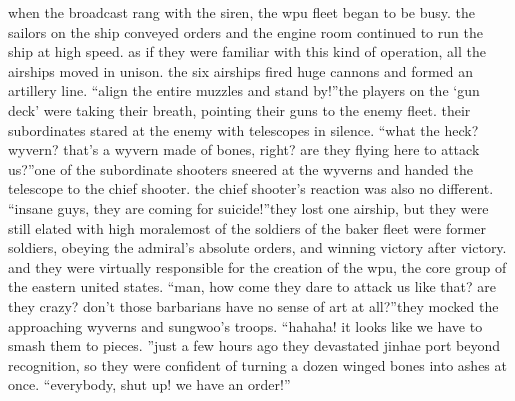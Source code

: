 when the broadcast rang with the siren, the wpu fleet began to be busy.
 the sailors on the ship conveyed orders and the engine room continued to run the ship at high speed.
as if they were familiar with this kind of operation, all the airships moved in unison.
the six airships fired huge cannons and formed an artillery line.
“align the entire muzzles and stand by!”the players on the ‘gun deck’ were taking their breath, pointing their guns to the enemy fleet.
their subordinates stared at the enemy with telescopes in silence.
“what the heck? wyvern? that’s a wyvern made of bones, right? are they flying here to attack us?”one of the subordinate shooters sneered at the wyverns and handed the telescope to the chief shooter.
 the chief shooter’s reaction was also no different.
“insane guys, they are coming for suicide!”they lost one airship, but they were still elated with high moralemost of the soldiers of the baker fleet were former soldiers, obeying the admiral’s absolute orders, and winning victory after victory.
 and they were virtually responsible for the creation of the wpu, the core group of the eastern united states.
“man, how come they dare to attack us like that? are they crazy? don’t those barbarians have no sense of art at all?”they mocked the approaching wyverns and sungwoo’s troops.
“hahaha! it looks like we have to smash them to pieces.
”just a few hours ago they devastated jinhae port beyond recognition, so they were confident of turning a dozen winged bones into ashes at once.
“everybody, shut up! we have an order!”

 